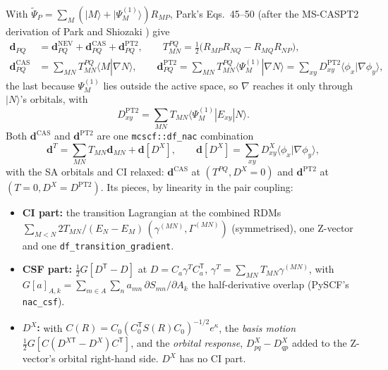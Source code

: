 \documentclass[11pt]{article}
\newcommand{\code}[1]{\texttt{#1}}
\newcommand{\T}{\mathsf T}
\begin{document}
With $\tilde\Psi_P = \sum_M(|M\rangle + |\Psi^{(1)}_M\rangle)R_{MP}$, Park's
Eqs.~45--50 \cite{park2020} (after the MS-CASPT2 derivation of Park and
Shiozaki \cite{park2017}) give
\begin{align}
  \mathbf d_{PQ} &= \mathbf d^{\mathrm{NEV}}_{PQ} + \mathbf d^{\mathrm{CAS}}_{PQ} + \mathbf d^{\mathrm{PT2}}_{PQ},\qquad
  T^{PQ}_{MN} = \tfrac12\bigl(R_{MP}R_{NQ} - R_{MQ}R_{NP}\bigr),\\
  \mathbf d^{\mathrm{CAS}}_{PQ} &= \sum_{MN}T^{PQ}_{MN}\langle M|\nabla N\rangle,\qquad
  \mathbf d^{\mathrm{PT2}}_{PQ} = \sum_{MN}T^{PQ}_{MN}\langle\Psi^{(1)}_M|\nabla N\rangle
  = \sum_{xy}D^{\mathrm{PT2}}_{xy}\langle\phi_x|\nabla\phi_y\rangle,
\end{align}
the last because $\Psi^{(1)}_M$ lies outside the active space, so $\nabla$
reaches it only through $|N\rangle$'s orbitals, with
\begin{equation}
  D^{\mathrm{PT2}}_{xy} = \sum_{MN}T_{MN}\langle\Psi^{(1)}_M|E_{xy}|N\rangle .
  \label{eq:dpt2}
\end{equation}
Both $\mathbf d^{\mathrm{CAS}}$ and $\mathbf d^{\mathrm{PT2}}$ are one
\code{mcscf::df\_nac} combination
\begin{equation}
  \mathbf d^{T} = \sum_{MN}T_{MN}\mathbf d_{MN} + \mathbf d[D^X],\qquad
  \mathbf d[D^X] = \sum_{xy}D^X_{xy}\langle\phi_x|\nabla\phi_y\rangle,
\end{equation}
with the SA orbitals and CI relaxed: $\mathbf d^{\mathrm{CAS}}$ at
$(T^{PQ}, D^X = 0)$ and $\mathbf d^{\mathrm{PT2}}$ at $(T = 0, D^X = D^{\mathrm{PT2}})$.
Its pieces, by linearity in the pair coupling:
\begin{itemize}
\item \textbf{CI part:} the transition Lagrangian at the combined RDMs
  $\sum_{M<N}2T_{MN}/(E_N - E_M)\,(\gamma^{(MN)}, \Gamma^{(MN)})$
  (symmetrised), one Z-vector and one \code{df\_transition\_gradient}.
\item \textbf{CSF part:} $\tfrac12 G[D^\T - D]$ at $D = C_a\gamma^T C_a^\T$,
  $\gamma^T = \sum_{MN}T_{MN}\gamma^{(MN)}$, with
  $G[a]_{A,k} = \sum_{m\in A}\sum_n a_{mn}\,\partial S_{mn}/\partial A_k$
  the half-derivative overlap (PySCF's \code{nac\_csf}).
\item \textbf{$D^X$:} with $C(R) = C_0(C_0^\T S(R)C_0)^{-1/2}e^\kappa$, the
  \emph{basis motion} $\tfrac12 G[C(D^{X\T} - D^X)C^\T]$, and the
  \emph{orbital response}, $D^X_{pq} - D^X_{qp}$ added to the Z-vector's
  orbital right-hand side. $D^X$ has no CI part.
\end{itemize}
\end{document}
